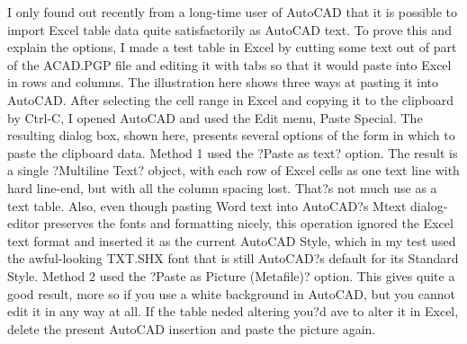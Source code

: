 \documentclass[a4paper]{article}
\begin{document}
{I only found out recently from a long-time user of AutoCAD that it is possible to import Excel table data quite satisfactorily as AutoCAD text. To prove this and explain the options, I made a test table in Excel by cutting some text out of part of the ACAD.PGP file and editing it with tabs so that it would paste into Excel in rows and columns. The illustration here shows three ways at pasting it into AutoCAD. After selecting the cell range in Excel and copying it to the clipboard by Ctrl-C, I opened AutoCAD and used the Edit menu, Paste Special. The resulting dialog box, shown here, presents several options of the form in which to paste the clipboard data.
Method 1 used the ?Paste as text? option. The result is a single ?Multiline Text? object, with each row of Excel cells as one text line with hard line-end, but with all the column spacing lost. That?s not much use as a text table. Also, even though pasting Word text into AutoCAD?s Mtext dialog-editor preserves the fonts and formatting nicely, this operation ignored the Excel text format and inserted it as the current AutoCAD Style, which in my test used the awful-looking TXT.SHX font that is still AutoCAD?s default for its Standard Style.
Method 2 used the ?Paste as Picture (Metafile)? option. This gives quite a good result, more so if you use a white background in AutoCAD, but you cannot edit it in any way at all. If the table neded altering you?d ave to alter it in Excel, delete the present AutoCAD insertion and paste the picture again.
}
\end{document}
